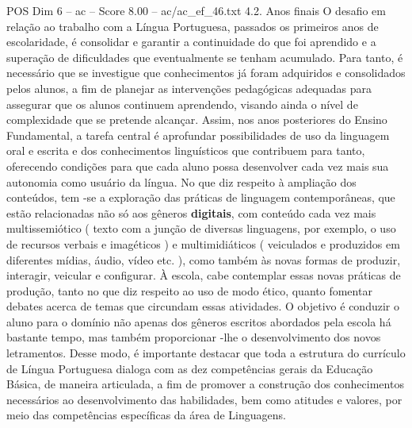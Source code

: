 \begin{textsample}{POS Dim 6 – ac – Score 8.00 – ac/ac\_ef\_46.txt}  \label{ex:f6_pos_156}
4.2.
Anos finais O desafio em relação ao trabalho com a Língua Portuguesa, passados os primeiros anos de escolaridade, é consolidar e garantir a continuidade do que foi aprendido e a superação de dificuldades que eventualmente se tenham acumulado.
Para tanto, é necessário que se investigue que conhecimentos já foram adquiridos e consolidados pelos alunos, a fim de planejar as intervenções pedagógicas adequadas para assegurar que os alunos continuem aprendendo, visando ainda o nível de complexidade que se pretende alcançar.
Assim, nos anos posteriores do Ensino Fundamental, a tarefa central é aprofundar possibilidades de uso da linguagem oral e escrita e dos conhecimentos linguísticos que contribuem para tanto, oferecendo condições para que cada aluno possa desenvolver cada vez mais sua autonomia como usuário da língua.
No que diz respeito à ampliação dos conteúdos, tem -se a exploração das práticas de linguagem contemporâneas, que estão relacionadas não só aos gêneros \textbf{digitais}, com conteúdo cada vez mais multissemiótico ( texto com a junção de diversas linguagens, por exemplo, o uso de recursos verbais e imagéticos ) e multimidiáticos ( veiculados e produzidos em diferentes mídias, áudio, vídeo etc. ), como também às novas formas de produzir, interagir, veicular e configurar.
À escola, cabe contemplar essas novas práticas de produção, tanto no que diz respeito ao uso de modo ético, quanto fomentar debates acerca de temas que circundam essas atividades.
O objetivo é conduzir o aluno para o domínio não apenas dos gêneros escritos abordados pela escola há bastante tempo, mas também proporcionar -lhe o desenvolvimento dos novos letramentos.
Desse modo, é importante destacar que toda a estrutura do currículo de Língua Portuguesa dialoga com as dez competências gerais da Educação Básica, de maneira articulada, a fim de promover a construção dos conhecimentos necessários ao desenvolvimento das habilidades, bem como atitudes e valores, por meio das competências específicas da área de Linguagens.

\end{textsample}
